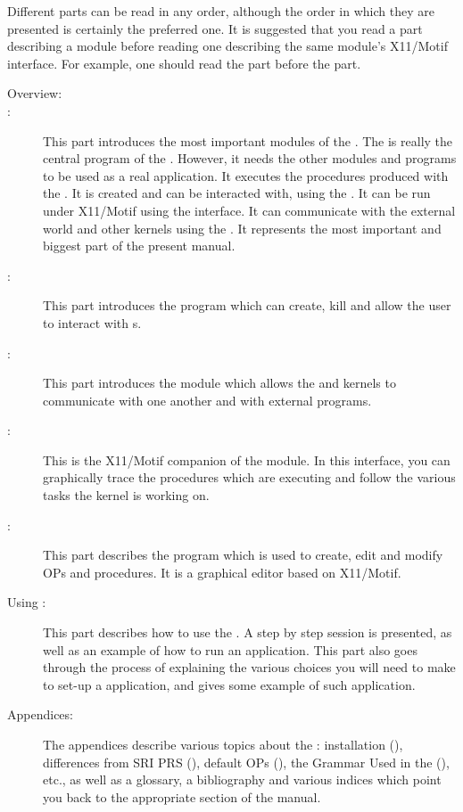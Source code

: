 Different parts can be read in any order, although the order in which they
are presented is certainly the preferred one. It is suggested that you read a part describing a 
module before reading one describing the
same module's X11/Motif interface. For example, one should read the
\CPK{} part before the \XPK{} part.

\begin{description}

\item[Overview:]

\item[\CPK{}:] This part introduces the most important modules of the
\COPRSDE{}.  The \CPK{} is really the central program of the \COPRSDE{}. However,
it needs the other modules and programs to be used as a real application. It
executes the procedures produced with the \OPE{}. It is created and can be
interacted with, using the \OPRSS{}. It can be run under X11/Motif using the
\XOPRS{} interface. It can communicate with the external world and other \COPRS{}
kernels using the \MPA{}. It represents the most important and biggest part of
the present manual.

\item[\OPRSS{}:] This part introduces the \OPRSS{} program which can create, kill
and allow the user to interact with \CPK{}s.

\item[\MPA{}:] This part introduces the module which allows the \COPRS{} and
\XOPRS{} kernels to communicate with one another and with external programs.

\item[\XPK{}:] This is the X11/Motif companion of the \CPK{} module. In this
interface, you can graphically trace the procedures which are executing and
follow the various tasks the kernel is working on.

\item[\OPE{}:] This part describes the program which is used to create, edit
and modify OPs and procedures. It is a graphical editor based on X11/Motif.

\item[Using \COPRS{}:] This part describes how to use the \COPRSDE{}. A step by
step \OPE{} session is presented, as well as an example of how to run an \XPK{}
application. This part also goes through the process of explaining the various
choices you will need to make to set-up a \COPRS{} application, and gives some
example of such application.

\item[Appendices:] The appendices describe various topics about the \COPRSDE{}:
installation (),
differences from SRI PRS (),
default OPs (), the Grammar Used in the \COPRSDE{}
(), etc., as well as a glossary, a bibliography
and various indices which point you back to the appropriate section of the
manual.

\end{description}

